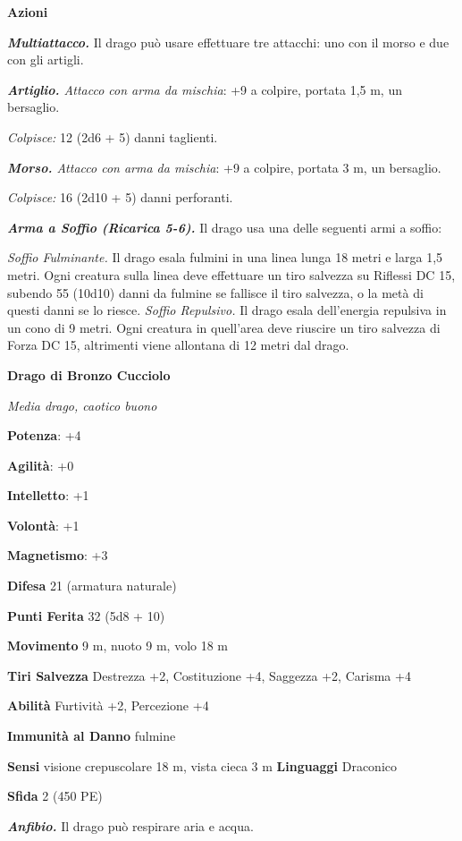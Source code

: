 \begin{multicols}{2}
\textbf{Azioni}

\emph{\textbf{Multiattacco.}} Il drago può usare effettuare tre
attacchi: uno con il morso e due con gli artigli.

\emph{\textbf{Artiglio.} Attacco con arma da mischia}: +9 a colpire,
portata 1,5 m, un bersaglio.

\emph{Colpisce:} 12 (2d6 + 5) danni taglienti.

\emph{\textbf{Morso.} Attacco con arma da mischia}: +9 a colpire,
portata 3 m, un bersaglio.

\emph{Colpisce:} 16 (2d10 + 5) danni perforanti.

\emph{\textbf{Arma a Soffio (Ricarica 5-6).}} Il drago usa una delle
seguenti armi a soffio:

\emph{Soffio Fulminante.} Il drago esala fulmini in una linea lunga 18
metri e larga 1,5 metri. Ogni creatura sulla linea deve effettuare un
tiro salvezza su Riflessi DC 15, subendo 55 (10d10) danni da fulmine se
fallisce il tiro salvezza, o la metà di questi danni se lo riesce.
\emph{Soffio Repulsivo.} Il drago esala dell'energia repulsiva in un
cono di 9 metri. Ogni creatura in quell'area deve riuscire un tiro
salvezza di Forza DC 15, altrimenti viene allontana di 12 metri dal
drago.

\textbf{Drago di Bronzo Cucciolo}

\emph{Media drago, caotico buono}

\textbf{Potenza}: +4

\textbf{Agilità}: +0

\textbf{Intelletto}: +1

\textbf{Volontà}: +1

\textbf{Magnetismo}: +3

\textbf{Difesa} 21 (armatura naturale)

\textbf{Punti Ferita} 32 (5d8 + 10)

\textbf{Movimento} 9 m, nuoto 9 m, volo 18 m

\textbf{Tiri Salvezza} Destrezza +2, Costituzione +4, Saggezza +2,
Carisma +4

\textbf{Abilità} Furtività +2, Percezione +4

\textbf{Immunità al Danno} fulmine

\textbf{Sensi} visione crepuscolare 18 m, vista cieca 3 m
\textbf{Linguaggi} Draconico

\textbf{Sfida} 2 (450 PE)

\emph{\textbf{Anfibio.}} Il drago può respirare aria e acqua.


\end{multicols}
